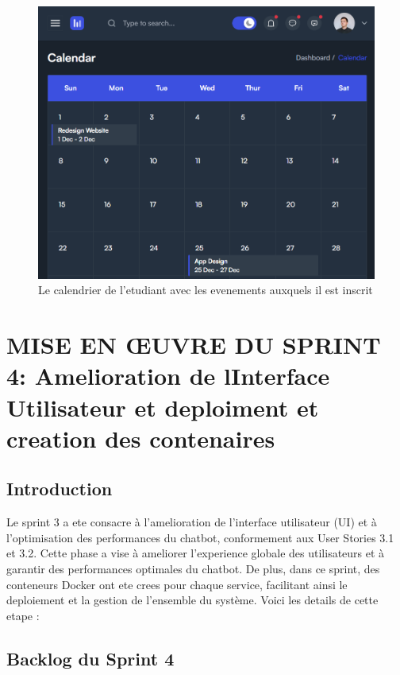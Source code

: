 \documentclass[a4paper, 11pt, openany]{report}
\begin{document}
\begin{figure}
\centering
\includegraphics[width=\textwidth]{calendar.png} 
\caption{Le calendrier de l'etudiant avec les evenements auxquels il est inscrit}
\label{fig:calender}
\end{figure}



\clearpage

\chapter{MISE EN ŒUVRE DU SPRINT 4: Amelioration de lInterface Utilisateur et  deploiment et creation des contenaires}


\section{Introduction}
Le sprint 3 a ete consacre à l'amelioration de l'interface utilisateur (UI) et à l'optimisation des performances du chatbot, conformement aux User Stories 3.1 et 3.2. Cette phase a vise à ameliorer l'experience globale des utilisateurs et à garantir des performances optimales du chatbot. De plus, dans ce sprint, des conteneurs Docker ont ete crees pour chaque service, facilitant ainsi le deploiement et la gestion de l'ensemble du système. Voici les details de cette etape :


\section{Backlog du Sprint 4}
\end{document}
